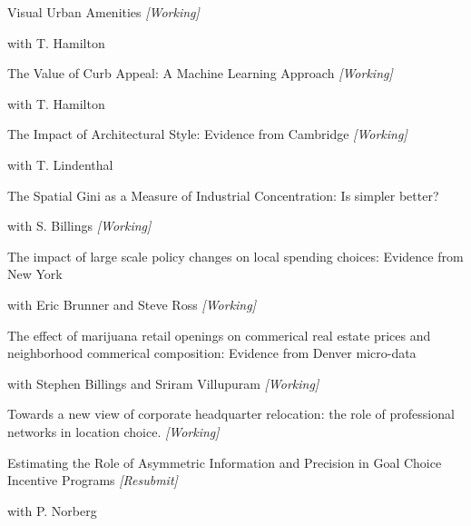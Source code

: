 \documentclass[10pt]{article}
\begin{document}
\begin{bibenum}

 \item[] Visual Urban Amenities  \emph{[Working]}
    \begin{innerlist}\item[] with T. Hamilton\end{innerlist}

\item[] The Value of Curb Appeal: A Machine Learning Approach  \emph{[Working]}
    \begin{innerlist}\item[] with T. Hamilton\end{innerlist}

\item[] The Impact of Architectural Style: Evidence from Cambridge \emph{[Working]}
    \begin{innerlist}\item[] with T. Lindenthal\end{innerlist}
    
\item[]The Spatial Gini as a Measure of Industrial Concentration: Is simpler better?
    \begin{innerlist}\item[] with S. Billings
      \emph{[Working]} \end{innerlist}

\item[]The impact of large scale policy changes on local spending choices: Evidence from New York
  \begin{innerlist}\item[] with Eric Brunner and Steve Ross \emph{[Working]}\end{innerlist}

\item[]The effect of marijuana retail openings on commerical real estate prices and neighborhood commerical composition: Evidence from Denver micro-data
   \begin{innerlist}\item[] with Stephen Billings and Sriram Villupuram \emph{[Working]}\end{innerlist}

\item[]Towards a new view of corporate headquarter relocation: the role of professional networks in location choice.
   \emph{[Working]}

 \item[]Estimating the Role of Asymmetric Information and Precision in
    Goal Choice Incentive Programs  \emph{[Resubmit]}
    \begin{innerlist}\item[] with P. Norberg\end{innerlist}


\end{bibenum}
\end{document}
